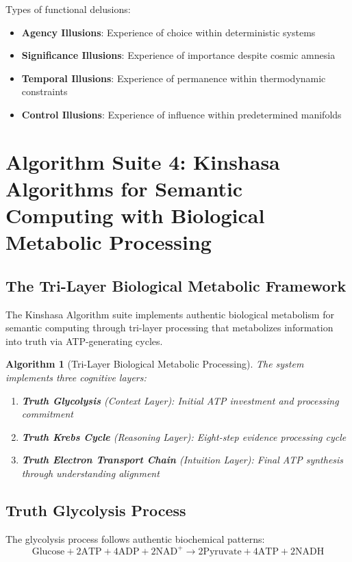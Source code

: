 \documentclass[12pt,a4paper]{article}
\newtheorem{algorithm_def}[theorem]{Algorithm}
\begin{document}
Types of functional delusions:
\begin{itemize}
\item \textbf{Agency Illusions}: Experience of choice within deterministic systems
\item \textbf{Significance Illusions}: Experience of importance despite cosmic amnesia
\item \textbf{Temporal Illusions}: Experience of permanence within thermodynamic constraints
\item \textbf{Control Illusions}: Experience of influence within predetermined manifolds
\end{itemize}

\section{Algorithm Suite 4: Kinshasa Algorithms for Semantic Computing with Biological Metabolic Processing}

\subsection{The Tri-Layer Biological Metabolic Framework}

The Kinshasa Algorithm suite implements authentic biological metabolism for semantic computing through tri-layer processing that metabolizes information into truth via ATP-generating cycles.

\begin{algorithm_def}[Tri-Layer Biological Metabolic Processing]
The system implements three cognitive layers:
\begin{enumerate}
\item \textbf{Truth Glycolysis} (Context Layer): Initial ATP investment and processing commitment
\item \textbf{Truth Krebs Cycle} (Reasoning Layer): Eight-step evidence processing cycle
\item \textbf{Truth Electron Transport Chain} (Intuition Layer): Final ATP synthesis through understanding alignment
\end{enumerate}
\end{algorithm_def}

\subsection{Truth Glycolysis Process}

The glycolysis process follows authentic biochemical patterns:
\begin{equation}
\text{Glucose} + 2\text{ATP} + 4\text{ADP} + 2\text{NAD}^+ \rightarrow 2\text{Pyruvate} + 4\text{ATP} + 2\text{NADH}
\end{equation}
\end{document}
